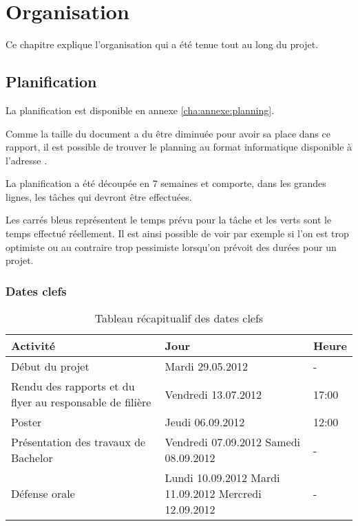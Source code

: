 
\chapter{Organisation} %
\label{cha:organisation}

Ce chapitre explique l'organisation qui a été tenue tout au long du projet. 

\section{Planification} %
\label{sec:planification}
La planification est disponible en annexe \ref{cha:annexe:planning}. 

\medskip

Comme la taille du document a du être diminuée pour avoir sa place dans ce rapport, il est possible de trouver le planning au format informatique disponible à l'adresse \cite{online:forge:planfin}.

\medskip

La planification a été découpée en 7 semaines et comporte, dans les grandes lignes, les tâches qui devront être effectuées.

\medskip

Les carrés bleus représentent le temps prévu pour la tâche et les verts sont le temps effectué réellement. Il est ainsi possible de voir par exemple si l'on est trop optimiste ou au contraire trop pessimiste lorsqu'on prévoit des durées pour un projet.

\subsection{Dates clefs} %
\begin{table}[h] %
\begin{tabularx}{\textwidth}{|X|X|X|}
  \hline
  \bf{Activité} & \bf{Jour} & \bf{Heure} \\  \hline
  Début du projet &	Mardi 29.05.2012 & -\\  \hline
Rendu des rapports et du flyer au responsable de filière	& Vendredi 13.07.2012 &	17:00 \\  \hline
Poster &	Jeudi	06.09.2012 &	12:00 \\  \hline
Présentation des travaux de Bachelor &	Vendredi 07.09.2012 \newline
Samedi	
08.09.2012 &	-\\  \hline
Défense orale &	Lundi 10.09.2012 \newline
Mardi 11.09.2012\newline
Mercredi 12.09.2012 &-\\  \hline
\end{tabularx}
\caption{Tableau récapitualif des dates clefs}
\end{table}


